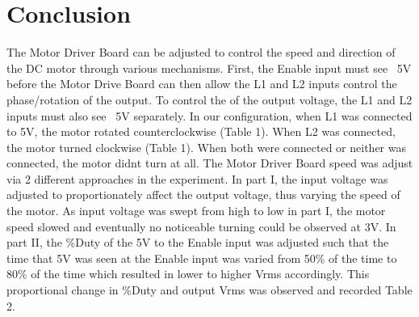 \section{Conclusion}
\label{sec:conclusion}


The Motor Driver Board can be adjusted to control the speed and direction of the DC motor through various mechanisms. First, the Enable input must see ~5V before the Motor Drive Board can then allow the L1 and L2 inputs control the phase/rotation of the output. To control the of the output voltage, the L1 and L2 inputs must also see ~5V separately. In our configuration, when L1 was connected to 5V, the motor rotated counterclockwise (Table 1). When L2 was connected, the motor turned clockwise (Table 1). When both were connected or neither was connected, the motor didnt turn at all.
The Motor Driver Board speed was adjust via 2 different approaches in the experiment. In part I, the input voltage was adjusted to proportionately affect the output voltage, thus varying the speed of the motor. As input voltage was swept from high to low in part I, the motor speed slowed and eventually no noticeable turning could be observed at 3V. In part II, the \%Duty of the 5V to the Enable input was adjusted such that the time that 5V was seen at the Enable input was varied from 50\% of the time to 80\% of the time which resulted in lower to higher Vrms accordingly. This proportional change in \%Duty and output Vrms was observed and recorded Table 2.




